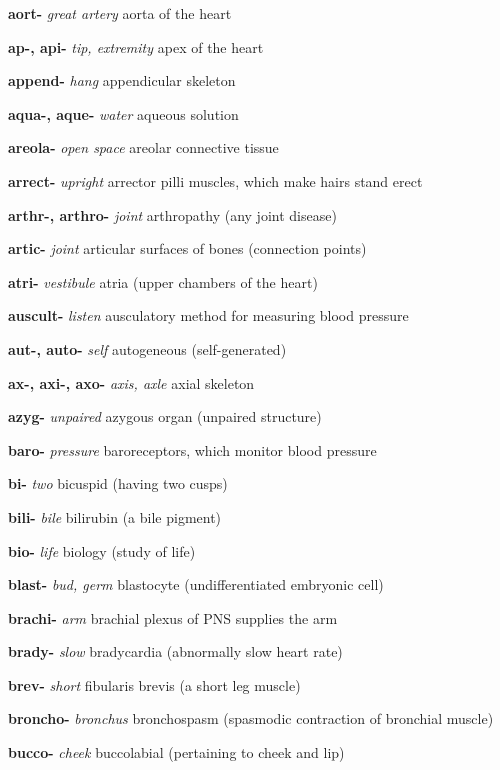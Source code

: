 \documentclass[10pt]{article}
\begin{document}
\begin{multicols}{2}
\begin{hangparas}{10pt}{1}
 \textbf{aort-} \textit{great artery } aorta of the heart \par
 \textbf{ap-, api-} \textit{tip, extremity } apex of the heart \par
 \textbf{append-} \textit{hang} appendicular skeleton \par
 \textbf{aqua-, aque-} \textit{water } aqueous solution \par
 \textbf{areola-} \textit{open space } areolar connective tissue \par
 \textbf{arrect-} \textit{upright } arrector pilli muscles, which make hairs stand erect \par
 \textbf{arthr-, arthro-} \textit{joint } arthropathy (any joint disease) \par
 \textbf{artic-} \textit{joint } articular surfaces of bones (connection points) \par
 \textbf{atri-} \textit{vestibule } atria (upper chambers of the heart) \par
 \textbf{auscult-} \textit{listen } ausculatory method for measuring blood pressure \par
 \textbf{aut-, auto-} \textit{self } autogeneous (self-generated) \par
 \textbf{ax-, axi-, axo-} \textit{axis, axle } axial skeleton \par
 \textbf{azyg-} \textit{unpaired } azygous organ (unpaired structure) \par
 \textbf{baro-} \textit{pressure } baroreceptors, which monitor blood pressure \par
 \textbf{bi-} \textit{two } bicuspid (having two cusps) \par
 \textbf{bili-} \textit{bile } bilirubin (a bile pigment) \par
 \textbf{bio-} \textit{life } biology (study of life) \par
 \textbf{blast-} \textit{bud, germ} blastocyte (undifferentiated embryonic cell) \par
 \textbf{brachi-} \textit{arm } brachial plexus of PNS supplies the arm \par
 \textbf{brady-} \textit{slow } bradycardia (abnormally slow heart rate) \par
 \textbf{brev-} \textit{short } fibularis brevis (a short leg muscle) \par
 \textbf{broncho-} \textit{bronchus } bronchospasm (spasmodic contraction of bronchial muscle) \par
 \textbf{bucco-} \textit{cheek } buccolabial (pertaining to cheek and lip) \par

\end{hangparas}
\end{multicols}
\end{document}
